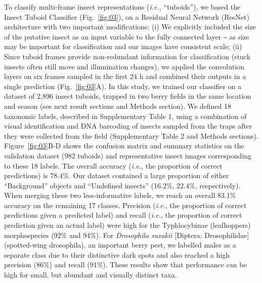 \documentclass[fleqn,10pt]{wlscirep}
\begin{document}
To classify multi-frame insect representations (\emph{i.e.}, “tuboids”), we based the Insect Tuboid Classifier (Fig.~\ref{fig:03}), on a Residual Neural Network (ResNet) architecture\cite{he_deep_2016} with two important modifications: (i) We explicitly included the size of the putative insect as an input variable to the fully connected layer ‒ as size may be important for classification and our images have consistent scale; (ii) Since tuboid frames provide non-redundant information for classification (stuck insects often still move and illumination changes), we applied the convolution layers on six frames sampled in the first 24 h and combined their outputs in a single prediction (Fig.~\ref{fig:03}A). In this study, we trained our classifier on a dataset of 2,896 insect tuboids, trapped in two berry fields in the same location and season (see next result sections and Methods section). We defined 18 taxonomic labels, described in Supplementary Table 1, using a combination of visual identification and DNA barcoding of insects sampled from the traps after they were collected from the field (Supplementary Table 2 and Methods sections). Figure~\ref{fig:03}B-D shows the confusion matrix and summary statistics on the validation dataset (982 tuboids) and representative insect images corresponding to these 18 labels. The overall accuracy (\emph{i.e.}, the proportion of correct predictions) is 78.4\%. Our dataset contained a large proportion of either “Background” objects and “Undefined insects” (16.2\%, 22.4\%, respectively). When merging these two less-informative labels, we reach an overall 83.1\% accuracy on the remaining 17 classes. Precision (\emph{i.e.}, the proportion of correct predictions given a predicted label) and recall (\emph{i.e.}, the proportion of correct prediction given an actual label) were high for the Typhlocybinae (leafhoppers) morphospecies (92\% and 94\%). For \emph{Drosophila suzukii} [Diptera: Drosophilidae] (spotted-wing drosophila), an important berry pest, we labelled males as a separate class due to their distinctive dark spots and also reached a high precision (86\%) and recall (91\%). These results show that performance can be high for small, but abundant and visually distinct taxa.
\end{document}

